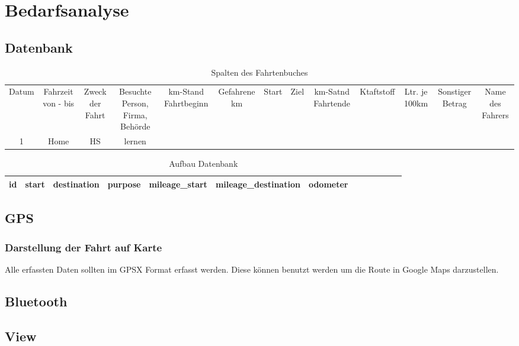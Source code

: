 \documentclass[a4paper]{article}
\begin{document}


\section{Bedarfsanalyse}

\subsection{Datenbank}

 \begin{table}
	\caption{Spalten des Fahrtenbuches}
    \centering
	\begin{tabular}{c c c c c c c c c c c c c}
		\hline
		Datum & Fahrzeit von - bis & Zweck der Fahrt  & Besuchte Person, Firma, Behörde &
		km-Stand Fahrtbeginn & Gefahrene km & Start & Ziel & km-Satnd Fahrtende & Ktaftstoff &
		Ltr. je 100km & Sonstiger Betrag & Name des Fahrers\\ [0.5ex]
		1 & Home & HS & lernen \\ [1ex]
		\hline
	\end{tabular}
	\label{table:nonlin}
 \end{table}

 \begin{table}
	\caption{Aufbau Datenbank}
    \centering
	\begin{tabular}{c c c c c c c c c c c c c}
		\hline
        id & start & destination & purpose & mileage_start & mileage_destination & odometer \\ [1ex]
		\hline
	\end{tabular}
	\label{table:nonlin}
 \end{table}

\subsection{GPS}

\subsubsection{Darstellung der Fahrt auf Karte}
Alle erfassten Daten sollten im GPSX Format erfasst werden. 
Diese können benutzt werden um die Route in Google Maps darzustellen.

\subsection{Bluetooth}

\subsection{View}
\end{document}
